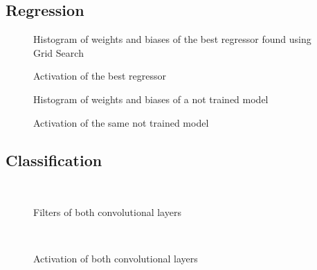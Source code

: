 \documentclass[11pt,a4paper,twocolumn]{IEEEtran}
\begin{document}
		\subsection{Regression}
			\begin{figure}[h]
				\centering
				
				\caption{Histogram of weights and biases of the best regressor found using Grid Search}
			\end{figure}
			\begin{figure}[h]
				\centering
				
				\caption{Activation of the best regressor}
			\end{figure}
			\newpage
			\begin{figure}[h]
				\centering
				
				\caption{Histogram of weights and biases of a not trained model}
			\end{figure}
			\begin{figure}[h]
				\centering
				
				\caption{Activation of the same not trained model}
			\end{figure}
		\newpage\subsection{Classification}
			\begin{figure}[h]
				\centering
				\\
				
				\caption{Filters of both convolutional layers}
			\end{figure}
			\begin{figure}[h]
				\centering
				\\
				
				\caption{Activation of both convolutional layers}
			\end{figure}
\end{document}
